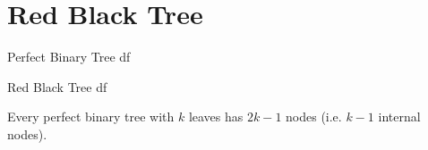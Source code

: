 \chapter{Red Black Tree}
\begin{definition}{Perfect Binary Tree}{}
	df
\end{definition}
\begin{definition}{Red Black Tree}{}
	df
\end{definition}
\begin{Lemma}{}{}
	Every perfect binary tree with $k$ leaves has $2k-1$  nodes (i.e. $k-1$ internal nodes).
\end{Lemma}